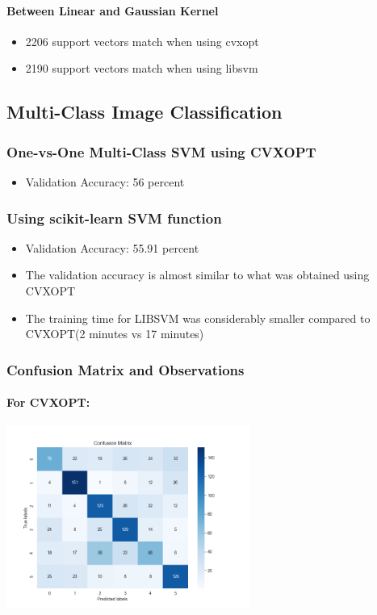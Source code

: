 \documentclass[12pt,a4paper]{article}
\begin{document}
\paragraph{Between Linear and Gaussian Kernel}
\begin{itemize}
    \item 2206 support vectors match when using cvxopt
    \item 2190 support vectors match when using libsvm
\end{itemize}

\subsection{Multi-Class Image Classification}
\subsubsection{One-vs-One Multi-Class SVM using CVXOPT}
\begin{itemize}
    \item Validation Accuracy: 56 percent
\end{itemize}

\subsubsection{Using scikit-learn SVM function}
\begin{itemize}
    \item Validation Accuracy: 55.91 percent
    \item The validation accuracy is almost similar to what was obtained using CVXOPT
    \item The training time for LIBSVM was considerably smaller compared to CVXOPT(2 minutes vs 17 minutes)
\end{itemize}

\subsubsection{Confusion Matrix and Observations}
\paragraph{For CVXOPT:}
\includegraphics[width=0.6\textwidth]{Assignment 2/q2/confusion_matrix cvxopt.png}
\end{document}
